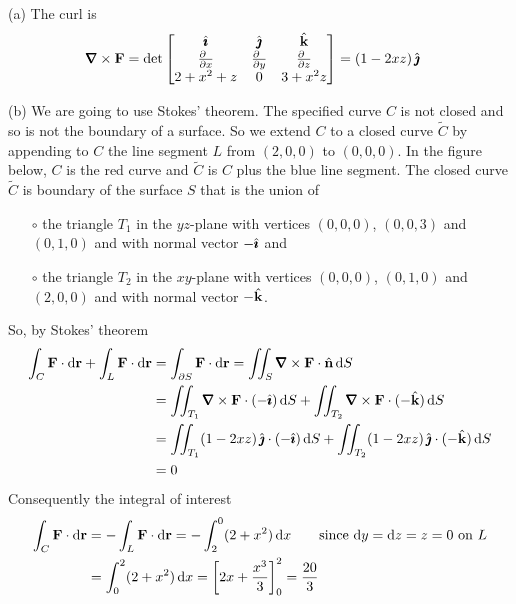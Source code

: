 \begin{solution}
(a) 
The curl is
\begin{align*}
\vnabla\times\vF
&=\det\left[\begin{matrix}
\hi &\hj &\hk \\
\tfrac{\partial\hfill}{\partial x} & \tfrac{\partial\hfill}{\partial y} & 
                \tfrac{\partial\hfill}{\partial z} \\
2+x^2+z &  0 & 3+x^2z
\end{matrix}
\right]
=(1-2xz)\,\hj
\end{align*}

\noindent (b) We are going to use Stokes' theorem. The specified curve $C$
is not closed and so is not the boundary of a surface. So we extend
$C$ to a closed curve $\tilde C$ by appending to $C$ the line segment $L$
from $(2,0,0)$ to $(0,0,0)$. In the figure below, $C$ is the red curve 
and $\tilde C$ is $C$ plus the blue line segment. 
The closed curve $\tilde C$ is boundary of the surface $S$ that is the
union of 
\begin{itemize}\itemsep1pt \parskip0pt  %
\item[$\circ$] the triangle $T_1$ in the $yz$-plane
with vertices $(0,0,0)$, $(0,0,3)$ and $(0,1,0)$ 
and with normal vector $-\hat{\pmb{\imath}}$ and
\item[$\circ$] the triangle $T_2$ in the $xy$-plane 
with vertices $(0,0,0)$, $(0,1,0)$ and $(2,0,0)$ 
and with normal vector $-\hat{\mathbf{k}}$.
\end{itemize}
So, by Stokes' theorem
\begin{align*}
\int_C \vF\cdot\dee{\vr} + \int_L \vF\cdot\dee{\vr}
&=  \int_{\partial S} \vF\cdot\dee{\vr}  
= \dblInt_S \vnabla\times \vF\cdot\hn\,\dee{S} \\ 
&= \dblInt_{T_1} \vnabla\times \vF\cdot(-\hi)\,\dee{S}
  + \dblInt_{T_2} \vnabla\times \vF\cdot(-\hk)\,\dee{S} \\ 
&= \dblInt_{T_1} (1-2xz)\,\hj\cdot(-\hi)\,\dee{S}
  + \dblInt_{T_2} (1-2xz)\,\hj\cdot(-\hk)\,\dee{S} \\ 
&=0
\end{align*}
Consequently the integral of interest
\begin{align*}
\int_C \mathbf{F}\cdot\mathrm{d}\mathbf{r}
&=- \int_L \mathbf{F}\cdot\mathrm{d}\mathbf{r}
=- \int_2^0 (2+x^2)\,\mathrm{d}x
\qquad\text{since $\mathrm{d}y=\mathrm{d}z=z=0$ on $L$} \\
&=\int_0^2 (2+x^2)\,\mathrm{d}x
={\left[2x+\frac{x^3}{3}\right]}_0^2
=\frac{20}{3}
\end{align*}
\end{solution}

